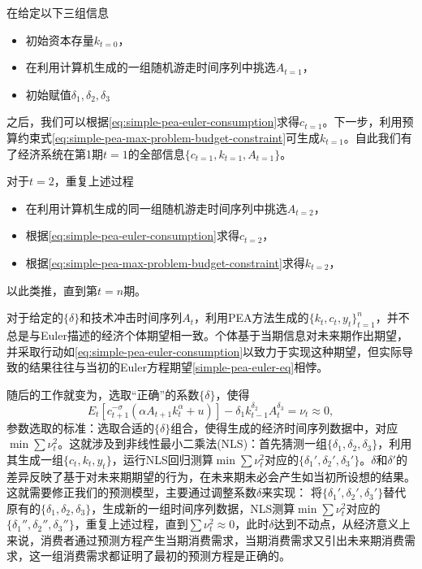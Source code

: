 在给定以下三组信息
\begin{itemize}
  \item 初始资本存量$k_{t=0}$，
  \item 在利用计算机生成的一组随机游走时间序列中挑选$A_{t=1}$，
  \item 初始赋值$\delta_{1}, \delta_{2}, \delta_{3}$
\end{itemize}
之后，我们可以根据\eqref{eq:simple-pea-euler-consumption}求得$c_{t=1}$。下一步，利用预算约束式\eqref{eq:simple-pea-max-problem-budget-constraint}可生成$k_{t=1}$。自此我们有了经济系统在第1期$t=1$的全部信息$\{c_{t=1},k_{t=1},A_{t=1}\}$。

对于$t=2$，重复上述过程
\begin{itemize}
  \item 在利用计算机生成的同一组随机游走时间序列中挑选$A_{t=2}$，
  \item 根据\eqref{eq:simple-pea-euler-consumption}求得$c_{t=2}$，
  \item 根据\eqref{eq:simple-pea-max-problem-budget-constraint}求得$k_{t=2}$，
\end{itemize}
以此类推，直到第$t=n$期。

对于给定的$\{\delta\}$和技术冲击时间序列$A_t$，利用PEA方法生成的$\{k_t, c_t, y_t\}_{t=1}^{n}$，并不总是与Euler描述的经济个体期望相一致。个体基于当期信息对未来期作出期望，并采取行动如\eqref{eq:simple-pea-euler-consumption}以致力于实现这种期望，但实际导致的结果往往与当初的Euler方程期望\eqref{simple-pea-euler-eq}相悖。

随后的工作就变为，选取``正确''的系数$\{\delta\}$，使得
\begin{equation}
  \label{simple-pea-parameter-criteria}
  E_t \left[ c _{t+1}^{-\sigma} \left( \alpha A_{t+1} k_{t}^{\alpha} + u \right)\right] - \delta_1 k_{t-1}^{\delta_2} A_{t}^{\delta_3} = \nu_t \approx 0,
\end{equation}
参数选取的标准：选取合适的$\{\delta\}$组合，使得生成的经济时间序列数据中，对应$\min \sum \nu_t^2$。这就涉及到非线性最小二乘法(NLS)：首先猜测一组$\{\delta_1, \delta_2, \delta_3\}$，利用其生成一组$\{c_t, k_t, y_t\}$，运行NLS回归测算$\min \sum \nu_t^2$对应的$\{\delta_1', \delta_2', \delta_3'\}$。$\delta$和$\delta'$的差异反映了基于对未来期期望的行为，在未来期未必会产生如当初所设想的结果。这就需要修正我们的预测模型，主要通过调整系数$\delta$来实现：
将$\{\delta_1', \delta_2', \delta_3'\}$替代原有的$\{\delta_1, \delta_2, \delta_3\}$，生成新的一组时间序列数据，NLS测算$\min \sum \nu_t^2$对应的$\{\delta_1'', \delta_2'', \delta_3''\}$，重复上述过程，直到$\sum \nu_t^2 \approx 0$，此时$\delta$达到不动点，从经济意义上来说，消费者通过预测方程产生当期消费需求，当期消费需求又引出未来期消费需求，这一组消费需求都证明了最初的预测方程是正确的。

